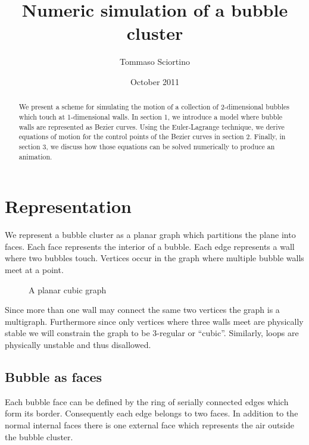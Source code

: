 \documentclass{article}
\title{Numeric simulation of a bubble cluster}
\author{Tommaso Sciortino}
\date{October 2011}
\begin{document}
\maketitle
\begin{abstract}
We present a scheme for simulating the motion of a collection of 2-dimensional
bubbles which touch at 1-dimensional walls.  In section 1, we introduce a model
where bubble walls are represented as Bezier curves.  Using the
Euler-Lagrange technique, we derive equations of motion for the
control points of the Bezier curves in section 2. Finally, in section 3, we
discuss how those equations can be solved numerically to produce an animation.
\end{abstract}
\clearpage

\section{Representation}
We represent a bubble cluster as a planar graph which partitions the plane
into faces. Each face represents the interior of a bubble. Each edge represents
a wall where two bubbles touch. Vertices occur in the graph where
multiple bubble walls meet at a point.

\begin{figure}[h]
\centering
{}
\caption{A planar cubic graph}
\end{figure}

Since more than one wall may connect the same two vertices the graph is a
multigraph. Furthermore since only vertices where three walls meet 
are physically stable we will constrain the graph to be 3-regular or ``cubic''.
Similarly, loops are physically unstable and thus disallowed.

\subsection{Bubble as faces}
Each bubble face can be defined by the ring of serially connected edges which
form its border. Consequently each edge belongs to two faces. In addition to
the normal internal faces there is one external face which represents the air
outside the bubble cluster.
\end{document}
